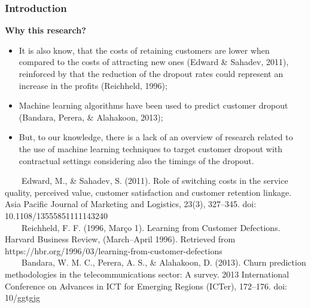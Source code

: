 \documentclass[10pt]{beamer}
\begin{document}
\begin{frame}
	\frametitle{Introduction}
	\Large
	\textbf{Why this research?}\\
		\begin{itemize} \normalsize

			\item It is also know, that the costs of retaining customers are lower when compared to the costs of attracting new ones \footnotesize(Edward \& Sahadev, 2011)\normalsize, reinforced by that the reduction of the dropout rates could represent an increase in the profits \footnotesize(Reichheld, 1996)\normalsize;
			\item Machine learning algorithms have been used to predict customer dropout \footnotesize(Bandara, Perera, \& Alahakoon, 2013)\normalsize;
			\item But, to our knowledge, there is a lack of an overview of research related to the use of machine learning techniques to target customer dropout with contractual settings considering also the timings of the dropout.
			
		\end{itemize}	
	\tiny
	~~~~Edward, M., \& Sahadev, S. (2011). Role of switching costs in the service quality, perceived value, customer satisfaction and customer retention linkage. Asia Pacific Journal of Marketing and Logistics, 23(3), 327–345. doi: 10.1108/13555851111143240 \\
	~~~~Reichheld, F. F. (1996, Março 1). Learning from Customer Defections. Harvard Business Review, (March–April 1996). Retrieved from https://hbr.org/1996/03/learning-from-customer-defections \\
	~~~~Bandara, W. M. C., Perera, A. S., \& Alahakoon, D. (2013). Churn prediction methodologies in the telecommunications sector: A survey. 2013 International Conference on Advances in ICT for Emerging Regions (ICTer), 172–176. doi: 10/ggtgjg\\
\end{frame}
\end{document}
